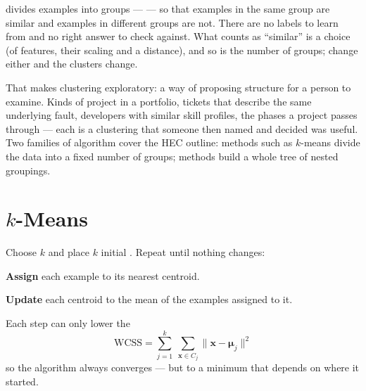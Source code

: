  divides examples into groups ---  --- so that
examples in the same group are similar and examples in different groups are not.
There are no labels to learn from and no right answer to check against. What
counts as ``similar'' is a choice (of features, their scaling and a distance), and
so is the number of groups; change either and the clusters change.

That makes clustering exploratory: a way of proposing structure for a person to
examine. Kinds of project in a portfolio, tickets that describe the same
underlying fault, developers with similar skill profiles, the phases a project
passes through --- each is a clustering that someone then named and decided was
useful. Two families of algorithm cover the HEC outline:
 methods such as $k$-means divide the data into a fixed number of
groups;  methods build a whole tree of nested groupings.

\section{$k$-Means}

\begin{definitionbox}
Choose $k$ and place $k$ initial . Repeat until nothing changes:
\begin{tightnum}
  \item \textbf{Assign} each example to its nearest centroid.
  \item \textbf{Update} each centroid to the mean of the examples assigned to it.
\end{tightnum}
Each step can only lower the 
\[
\text{WCSS} = \sum_{j=1}^{k}\ \sum_{\mathbf{x} \in C_j} \|\mathbf{x} - \boldsymbol{\mu}_j\|^2
\]
so the algorithm always converges --- but to a  minimum that depends
on where it started.
\end{definitionbox}

